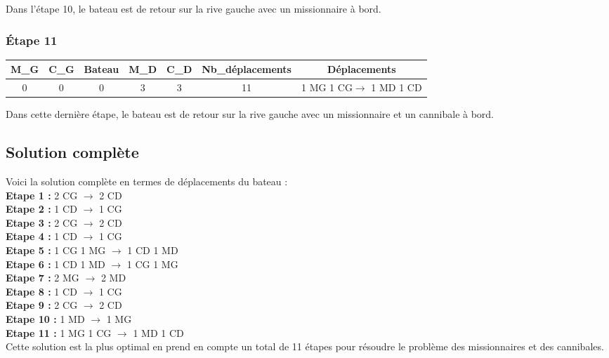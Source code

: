 \documentclass{article}
\begin{document}
\noindent Dans l'étape 10, le bateau est de retour sur la rive gauche avec un missionnaire à bord.

\subsubsection{Étape 11}

\begin{center}
\begin{tabular}{|c|c|c|c|c|c|c|}
\hline
\textbf{M\_G} & \textbf{C\_G} & \textbf{Bateau} & \textbf{M\_D} & \textbf{C\_D} & \textbf{Nb\_déplacements} & \textbf{Déplacements} \\
\hline
0 & 0 & 0 & 3 & 3 & 11 & 1 MG 1 CG$\rightarrow$ 1 MD 1 CD\\
\hline
\end{tabular}
\end{center}
Dans cette dernière étape, le bateau est de retour sur la rive gauche avec un missionnaire et un cannibale à bord.

\subsection{Solution complète}

Voici la solution complète en termes de déplacements du bateau :
\newline
\\
{\bf Etape 1 : }2 CG $\rightarrow$ 2 CD \\
{\bf Etape 2 : }1 CD $\rightarrow$ 1 CG \\
{\bf Etape 3 : }2 CG $\rightarrow$ 2 CD \\
{\bf Etape 4 : }1 CD $\rightarrow$ 1 CG \\
{\bf Etape 5 : }1 CG 1 MG $\rightarrow$ 1 CD 1 MD \\
{\bf Etape 6 : }1 CD 1 MD $\rightarrow$ 1 CG 1 MG \\
{\bf Etape 7 : }2 MG $\rightarrow$ 2 MD \\
{\bf Etape 8 : }1 CD  $\rightarrow$ 1 CG \\
{\bf Etape 9 : }2 CG $\rightarrow$ 2 CD \\
{\bf Etape 10 : }1 MD $\rightarrow$ 1 MG \\
{\bf Etape 11 : }1 MG 1 CG $\rightarrow$ 1 MD 1 CD \\

\noindent Cette solution est la plus optimal en prend en compte un total de 11 étapes pour résoudre le problème des missionnaires et des cannibales.
\end{document}
